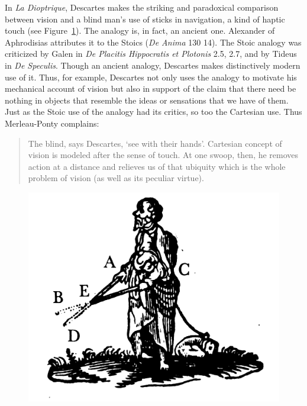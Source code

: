 \documentclass[12pt]{article}
\begin{document}
In \emph{La Dioptrique}, Descartes makes the striking and paradoxical comparison between vision and a blind man's use of sticks in navigation, a kind of haptic touch (see Figure~\ref{fig:blind}). The analogy is, in fact, an ancient one. Alexander of Aphrodisias attributes it to the Stoics (\emph{De Anima} 130 14). The Stoic analogy was criticized by Galen in \emph{De Placitis Hippocratis et Plotonis} 2.5, 2.7, and by Tideus in \emph{De Speculis}. Though an ancient analogy, Descartes makes distinctively modern use of it. Thus, for example, Descartes not only uses the analogy to motivate his mechanical account of vision but also in support of the claim that there need be nothing in objects that resemble the ideas or sensations that we have of them. Just as the Stoic use of the analogy had its critics, so too the Cartesian use. Thus Merleau-Ponty complains:
\begin{quote}
	The blind, says Descartes, ‘see with their hands’. Cartesian concept of vision is modeled after the sense of touch. At one swoop, then, he removes action at a distance and relieves us of that ubiquity which is the whole problem of vision (as well as its peculiar virtue). \citep[170]{Merleau-Ponty:1964aa}
\end{quote}

\begin{figure}[htbp]
	\centering
		\includegraphics[scale=2]{graphics/blind.jpeg}
	\caption{\citealt{Descartes:1637uq}}
	\label{fig:blind}
\end{figure}
\end{document}
